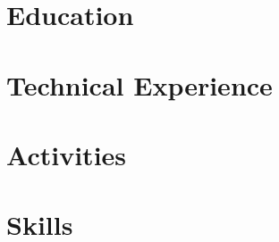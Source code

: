 \documentclass[10pt]{article}
\begin{document}
    \section{Education}
    

    \section{Technical Experience}
    

    \section{Activities}
    

    \section{Skills}
    
\end{document}
